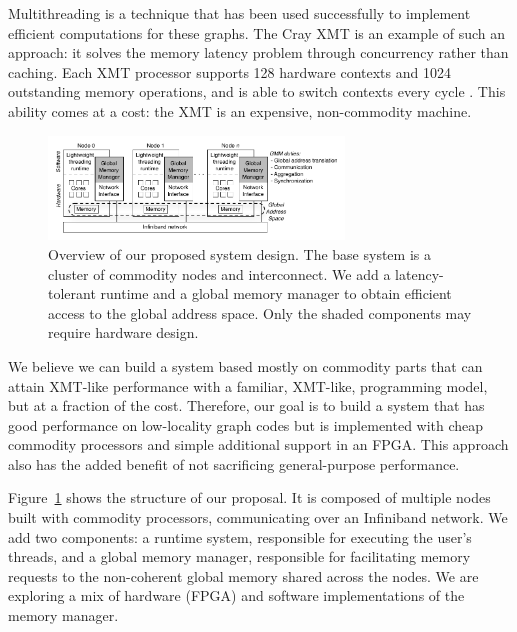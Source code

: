 \documentclass[10pt,nocopyrightspace,preprint]{sigplanconf}
\begin{document}
Multithreading is a technique that has been used successfully to
implement efficient computations for these graphs. The Cray XMT is an
example of such an approach: it solves the memory latency problem
through concurrency rather than caching. Each XMT processor supports
128 hardware contexts and 1024 outstanding memory operations, and is
able to switch contexts every cycle \cite{tera, feo-xmt}. This ability
comes at a cost: the XMT is an expensive, non-commodity
machine.

\begin{figure}[htbp]
  \begin{center}
    \vspace{-0.25in}
    \includegraphics[width=0.7\textwidth]{figures/system-overview.pdf}
    \vspace{-0.1in}
	\end{center}
	\caption{Overview of our proposed system design. The base
          system is a cluster of commodity nodes and interconnect. We
          add a latency-tolerant runtime and a global memory manager
          to obtain efficient access to the global address space. Only
          the shaded components may require hardware design.}
	\label{fig:system-overview}
\end{figure}


We believe we can build a system based mostly on commodity parts that
can attain XMT-like performance with a familiar, XMT-like,
programming model, but at a fraction of the cost. Therefore, our goal
is to build a system that has good performance on low-locality graph
codes but is implemented with cheap commodity processors and simple
additional support in an FPGA. This approach also has the added
benefit of not sacrificing general-purpose performance.

Figure~\ref{fig:system-overview} shows the structure of our
proposal. It is composed of multiple nodes built with commodity
processors, communicating over an Infiniband network. We add two
components: a runtime system, responsible for executing the user's
threads, and a global memory manager, responsible for facilitating
memory requests to the non-coherent global memory shared across the
nodes.  We are exploring a mix of hardware (FPGA) and software
implementations of the memory manager.
 
\end{document}
